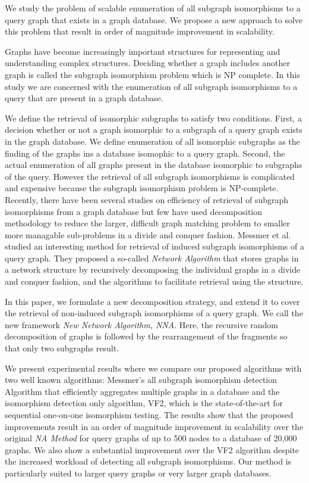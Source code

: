 We study the problem of scalable enumeration of all subgraph isomorphisms to a query graph that exists in a graph database. We  propose a new  approach to solve this problem that result in order of magnitude improvement in scalability. 

Graphs have become increasingly important structures for representing and understanding complex structures. Deciding whether a graph includes another graph is called the subgraph isomorphism problem which is NP complete. In this study we are concerned with the enumeration of all subgraph isomorphisms to a query that are present in a graph database.

We define the retrieval of isomorphic subgraphs to satisfy two conditions.  
First, a decision whether or not a graph isomorphic to a subgraph of a query graph exists in the graph database.
We define enumeration of all isomorphic subgraphs as the finding of the graphs ins a database isomophic to a query graph.
 Second, the actual enumeration of all graphs present in the database isomorphic to subgraphs of the query. However the retrieval of all subgraph isomorphisms is complicated and expensive because the subgraph isomorphism problem is NP-complete.
Recently, there have been several studies on efficiency of retrieval of subgraph isomorphisms from a graph database but few have used decomposition methodology to reduce the larger, difficult graph matching problem to smaller more managable sub-problems in a divide and conquer fashion. Messmer et al. studied an interesting method for retrieval of induced subgraph isomorphisms of a query graph. They proposed a so-called \textit{Network Algorithm} that stores graphs  in a network structure  by recursively decomposing the individual graphs in a divide and conquer fashion, and the algorithms to facilitate retrieval using the structure.

In this paper, we formulate a new decomposition strategy, and extend it to cover the retrieval of non-induced subgraph isomorphisms of a query graph. We call the new framework  \textit{New  Network Algorithm, NNA}. Here, the recursive random decomposition of graphs is followed by the rearrangement of the fragments so that only two subgraphs result.

We present experimental results where we compare our proposed algorithms with two well known algorithms: Messmer's all subgraph isomorphism detection Algorithm that efficiently aggregates multiple graphs in a database and the isomorphism detection only algorithm, VF2, which is the state-of-the-art for sequential one-on-one isomorphism testing. The results show that the proposed improvements result in an order of magnitude improvement in scalability over the original \textit{NA Method}  for query graphs of up to 500 nodes to a database of 20,000 graphs. We also show a substantial improvement over the VF2 algorithm despite the increased workload of detecting all subgraph isomorphisms. Our method is particularly suited to larger query graphs or very larger graph databases.

